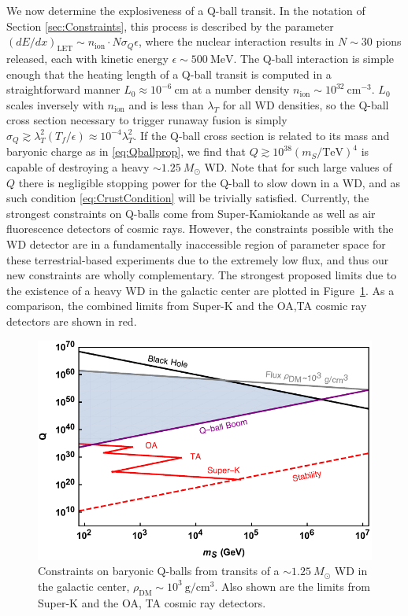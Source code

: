 \documentclass[twocolumn,showpacs,preprintnumbers,amsmath,amssymb,prd]{revtex4}
\begin{document}
We now determine the explosiveness of a Q-ball transit. 
In the notation of Section \ref{sec:Constraints}, this process is described by the parameter $(dE/dx)_\text{LET} \sim n_\text{ion} \cdot N \sigma_Q \epsilon$, where the nuclear interaction results in $N \sim 30$ pions released, each with kinetic energy $\epsilon \sim 500 ~\text{MeV}$.
The Q-ball interaction is simple enough that the heating length of a Q-ball transit is computed in a straightforward manner $L_0 \approx 10^{-6} ~\text{cm}$ at a number density $n_\text{ion} \sim 10^{32}~\text{cm}^{-3}$. $L_0$ scales inversely with $n_\text{ion}$ and is less than $\lambda_T$ for all WD densities, so the Q-ball cross section necessary to trigger runaway fusion is simply $\sigma_Q \gtrsim \lambda_T^2 (T_f/\epsilon) \approx 10^{-4} \lambda_T^2$.
If the Q-ball cross section is related to its mass and baryonic charge as in \eqref{eq:Qballprop}, we find that $Q \gtrsim 10^{38} (m_S/\text{TeV})^4$ is capable of destroying a heavy $\sim 1.25 ~M_{\odot}$ WD.
Note that for such large values of $Q$ there is negligible stopping power for the Q-ball to slow down in a WD, and as such condition \eqref{eq:CrustCondition} will be trivially satisfied.
Currently, the strongest constraints on Q-balls come from Super-Kamiokande as well as air fluorescence detectors of cosmic rays.
However, the constraints possible with the WD detector are in a fundamentally inaccessible region of parameter space for these terrestrial-based experiments due to the extremely low flux, and thus our new constraints are wholly complementary.
The strongest proposed limits due to the existence of a heavy WD in the galactic center are plotted in Figure~\ref{fig:Qballconstraint}. As a comparison, the combined limits from Super-K and the OA,TA cosmic ray detectors are shown in red. 
\begin{figure}
\includegraphics[scale=.55]{Qballconstraint.pdf}
\caption{Constraints on baryonic Q-balls from transits of a $\sim 1.25 ~M_{\odot}$ WD in the galactic center, $\rho_\text{DM} \sim 10^3 ~\text{g}/\text{cm}^3$. Also shown are the limits from Super-K and the OA, TA cosmic ray detectors.}
\label{fig:Qballconstraint}
\end{figure}
\end{document}

